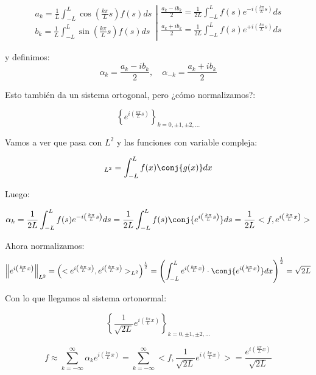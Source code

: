 		\[
		\left. \begin{array}{r}
			a_k = \frac{1}{L} \int^{L}_{-L} \cos \left( \frac{k \pi}{L} s \right) f(s) ds\\
			b_k = \frac{1}{L} \int^{L}_{-L} \sin \left( \frac{k \pi}{L} s \right) f(s) ds
		\end{array} \right| \begin{array}{l}
			\frac{a_k - ib_k}{2} = \frac{1}{2L} \int_{-L}^L f(s) e^{-i \left( \frac{k \pi}{L} s \right)} ds \\
			\frac{a_k + ib_k}{2} = \frac{1}{2L} \int_{-L}^L f(s) e^{+i \left( \frac{k \pi}{L} s \right)} ds \\
		\end{array}
		\]

		y definimos:
		\[
			\alpha_k = \frac{a_k - ib_k}{2}, \quad \alpha_{-k} = \frac{a_k + ib_k}{2}
		\]

		Esto también da un sistema ortogonal, pero ¿cómo normalizamos?:

		\[\left\{ e^{i \left( \frac{k \pi}{L} s \right)} \right\}_{k = 0,±1,±2,…} \]

		Vamos a ver que pasa con $L^2$ y las funciones con variable compleja:

		\[<f,g>_{L^2} = \int^L_{-L} f(x) \conj{g(x)} dx \]

		Luego:

		\[ \alpha_k = \frac{1}{2L} \int^L_{-L} f(s) e^{-i \left( \frac{k \pi}{L} s \right)} ds = \frac{1}{2L} \int_{-L}^L f(s) \conj{e^{i \left( \frac{k \pi}{L} s \right)}} ds = \frac{1}{2L} <f, e^{i \left( \frac{k \pi}{L} x \right)}> \]

		Ahora normalizamos:
		\[
		\left\|e^{i \left( \frac{k \pi}{L} x \right)}\right\|_{L^2} = \left( < e^{i \left( \frac{k \pi}{L} x \right)}, e^{i \left( \frac{k \pi}{L} x \right)} >_{L^2} \right)^{\frac{1}{2}} = \left( \int^{L}_{-L} e^{i \left( \frac{k \pi}{L} x \right)} \cdot \conj{ e^{i \left( \frac{k \pi}{L} x \right)}} dx \right)^{\frac{1}{2}} = \sqrt{2L}
		\]

		Con lo que llegamos al sistema ortonormal:

		\[
			\left\{ \frac{1}{\sqrt{2L}} e^{i \left( \frac{k \pi}{L} x \right)} \right\}_{k = 0, ±1, ±2, …}
		\]

		\[
		f ≈ \sum_{k=-\infty}^\infty \alpha_k e^{i \left( \frac{k \pi}{L} x \right)} = \sum_{k = -\infty}^\infty < f, \frac{1}{\sqrt{2L}} e^{i \left( \frac{k \pi}{L} x \right)} > = \frac{e^{i \left( \frac{k \pi}{L} x \right)}}{\sqrt{2L}}
		\]

